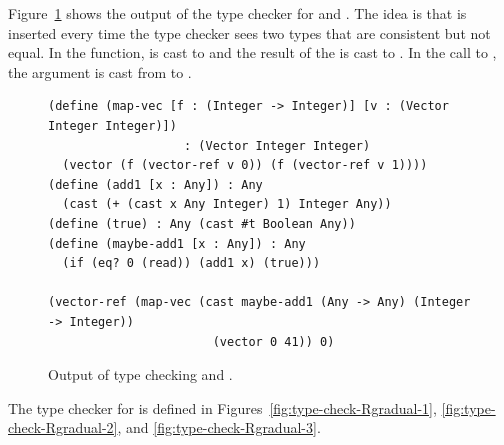 \documentclass[11pt]{book}
\begin{document}
Figure~\ref{fig:map-vec-cast} shows the output of the type checker for
 and .  The idea is that  is
inserted every time the type checker sees two types that are
consistent but not equal. In the  function,  is
cast to  and the result of the \code{+} is cast to
.  In the call to , the  argument
is cast from  to .

\begin{figure}[btp]
\begin{lstlisting}[basicstyle=\ttfamily\footnotesize]
(define (map-vec [f : (Integer -> Integer)] [v : (Vector Integer Integer)])
                   : (Vector Integer Integer)
  (vector (f (vector-ref v 0)) (f (vector-ref v 1))))
(define (add1 [x : Any]) : Any
  (cast (+ (cast x Any Integer) 1) Integer Any))
(define (true) : Any (cast #t Boolean Any))
(define (maybe-add1 [x : Any]) : Any
  (if (eq? 0 (read)) (add1 x) (true)))

(vector-ref (map-vec (cast maybe-add1 (Any -> Any) (Integer -> Integer))
                       (vector 0 41)) 0)
\end{lstlisting}
\caption{Output of type checking 
  and .}
\label{fig:map-vec-cast}
\end{figure}


The type checker for \LangGrad{} is defined in
Figures~\ref{fig:type-check-Rgradual-1}, \ref{fig:type-check-Rgradual-2},
and \ref{fig:type-check-Rgradual-3}.
\end{document}
